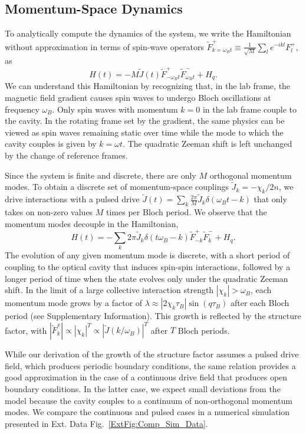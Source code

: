 \documentclass[aps,pra,superscriptaddress,12pt]{revtex4-1} %
\begin{document}
\begin{bibunit}
\subsection{Momentum-Space Dynamics}

To analytically compute the dynamics of the system, we write the Hamiltonian without approximation in terms of spin-wave operators $\tilde{F}^+_{k=\omega_B t} \equiv \frac{1}{\sqrt{M}}\sum_{l} e^{-ikl} {F}^+_l$, as
\begin{equation}
H(t) = -M \tilde{J}(t) \tilde{F}^+_{-\omega_B t} \tilde{F}^-_{\omega_B t} + H_q.
\end{equation}
We can understand this Hamiltonian by recognizing that, in the lab frame, the magnetic field gradient causes spin waves to undergo Bloch oscillations at frequency $\omega_B$. Only spin waves with momentum $k=0$ in the lab frame couple to the cavity. In the rotating frame set by the gradient, the same physics can be viewed as spin waves remaining static over time while the mode to which the cavity couples is given by $k=\omega t$. The quadratic Zeeman shift is left unchanged by the change of reference frames.

Since the system is finite and discrete, there are only $M$ orthogonal momentum modes. To obtain a discrete set of momentum-space couplings $\tilde{J}_k = -\chi_k/2n$, we drive interactions with a pulsed drive $\tilde{J}(t) = \sum_k \frac{2\pi}{M} \tilde{J}_k \delta(\omega_Bt-k)$ that only takes on non-zero values $M$ times per Bloch period. We observe that the momentum modes decouple in the Hamiltonian,
\begin{equation}
H(t) = -\sum_k 2\pi \tilde{J}_k \delta(t\omega_B-k) \tilde{F}^+_{-k} \tilde{F}^-_{k} + H_q.
\label{eq:PulsedH}
\end{equation}
The evolution of any given momentum mode is discrete, with a short period of coupling to the optical cavity that induces spin-spin interactions, followed by a longer period of time when the state evolves only under the quadratic Zeeman shift. In the limit of a large collective interaction strength $|\chi_k| > \omega_B$, each momentum mode grows by a factor of $\lambda \approx |2\chi_k \tau_B| \sin(q\tau_B)$ after each Bloch period (see Supplementary Information). This growth is reflected by the structure factor, with ${|\tilde{F}^x_{k}| \propto |\chi_k|^T \propto |\tilde{J}(k/\omega_B)|^T}$ after $T$ Bloch periods.

While our derivation of the growth of the structure factor assumes a pulsed drive field, which produces periodic boundary conditions, the same relation provides a good approximation in the case of a continuous drive field that produces open boundary conditions.  In the latter case, we expect small deviations from the model because the cavity couples to a continuum of non-orthogonal momentum modes.  We compare the continuous and pulsed cases in a numerical simulation presented in Ext. Data Fig.~\ref{ExtFig:Comp_Sim_Data}.


\end{bibunit}
\end{document}

